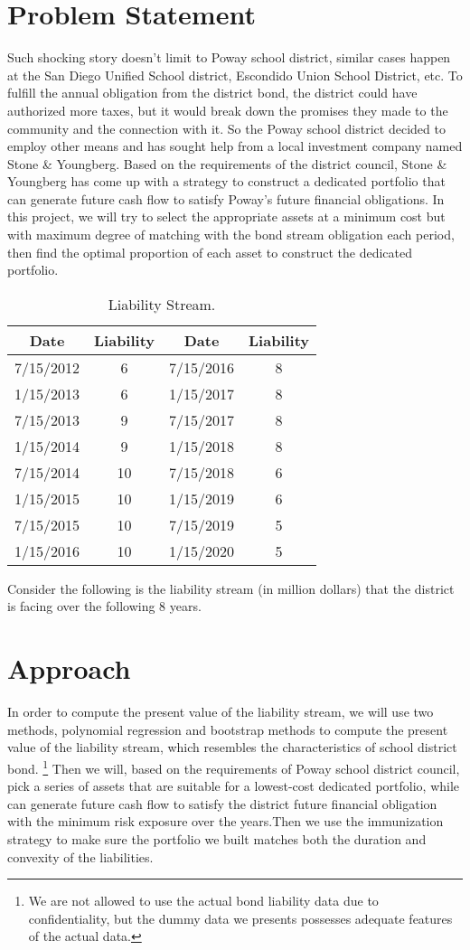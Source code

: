 \documentclass[12pt,letterpaper]{article}
\theoremstyle{definition}
\begin{document}
\section{Problem Statement}
Such shocking story doesn't limit to Poway school district, similar cases happen at the San Diego Unified School district, Escondido Union School District, etc. To fulfill the annual obligation from the district bond, the district could have authorized more taxes, but it would break down the promises they made to the community and the connection with it. So the Poway school district decided to employ other means and has sought help from a local investment company named Stone \& Youngberg.  Based on the requirements of the district  council, Stone \& Youngberg has come up with a strategy to construct a dedicated portfolio that can generate future cash flow to satisfy Poway's future financial obligations. In this project, we will try to select the appropriate assets at a minimum cost but with maximum degree of matching with the bond stream obligation each period, then find the optimal proportion of each asset to construct the dedicated portfolio.
\begin{table}[h]
\centering  
\begin{tabular}{cccc}
\hline
Date  &Liability  &Date  &Liability\\ \hline  
7/15/2012  &6  &7/15/2016  &8\\
1/15/2013  &6  &1/15/2017  &8\\ 
7/15/2013  &9  &7/15/2017  &8\\ 
1/15/2014  &9  &1/15/2018  &8\\ 
7/15/2014  &10 &7/15/2018  &6\\ 
1/15/2015  &10  &1/15/2019  &6\\ 
7/15/2015  &10  &7/15/2019  &5 \\ 
1/15/2016  &10  &1/15/2020  &5\\ \hline
\end{tabular}
\caption{Liability Stream.}
\end{table}
Consider the following is the liability stream (in million dollars) that the district is facing over the following 8 years.


\section{Approach}
In order to compute the present value of the liability stream, we will use two methods, polynomial regression and bootstrap methods to compute the present value of the liability stream, which resembles the characteristics of school district bond. 
\footnote{We are not allowed to use the actual bond liability data due to confidentiality, but the dummy data we presents possesses adequate features of the actual data.}
Then we will, based on the requirements of Poway school district council, pick a series of assets that are suitable for a lowest-cost dedicated portfolio, while can generate future cash flow to satisfy the  district future financial obligation with the minimum risk exposure over the years.Then we use the immunization strategy to make sure the portfolio we built matches both the duration and convexity of the liabilities.
\end{document}
